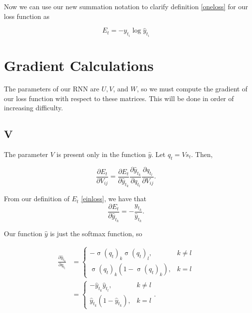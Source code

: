 \documentclass[11pt,twoside]{article}
\DeclareMathOperator{\sigmoid}{\sigma}
\begin{document}
\noindent Now we can use our new summation notation to clarify definition \eqref{oneloss} for our loss function as

\begin{equation}
\label{einloss}
E_t=-y_{t_i}\log{\hat{y}_{t_i}}
\end{equation}

\section{Gradient Calculations}
The parameters of our RNN are $U, V$, and $W$, so we must compute the gradient of our loss function with respect to these matrices. This will be done in order of increasing difficulty.

\subsection{V}
The parameter $V$ is present only in the function $\hat{y}$. Let $q_t=V s_t$. Then,

\begin{equation}
\frac{\partial E_t}{\partial V_{i j}}=\frac{\partial E_t}{\partial \hat{y}_{t_k}}\frac{\partial \hat{y}_{t_k}}{\partial q_{t_l}}\frac{\partial q_{t_l}}{\partial  V_{i j}}.
\end{equation}

\noindent From our definition of $E_t$ \eqref{einloss}, we have that 
\begin{equation}
\label{e8}
\frac{\partial E_t}{\partial \hat{y}_{t_k}}=-\frac{y_{t_k}}{\hat{y}_{t_k}}.
\end{equation}

\noindent Our function $\hat{y}$ is just the softmax function, so

\begin{subequations}
\begin{align}
\frac{\partial \hat{y}_{t_k}}{\partial q_{t_l}}&=\left\{
	\begin{array}{lr}
	-\sigmoid(q_t)_k\sigmoid(q_t)_l, & k\neq l \\
	\sigmoid(q_t)_k\left(1-\sigmoid(q_t)_k\right), & k=l
	\end{array}
	\right. \\
\label{e9}
&=\left\{
	\begin{array}{lr}
	-\hat{y}_{t_k}\hat{y}_{t_l}, & k\neq l \\
	\hat{y}_{t_k}\left(1-\hat{y}_{t_k}\right), & k=l
	\end{array}
	\right..
\end{align}
\end{subequations}
\end{document}
